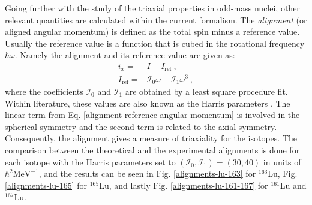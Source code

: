Going further with the study of the triaxial properties in odd-mass nuclei, other relevant quantities are calculated within the current formalism. The \emph{alignment} (or aligned angular momentum) is defined as the total spin minus a reference value. Usually the reference value is a function that is cubed in the rotational frequency $\hbar\omega$. Namely the alignment and its reference value are given as:
\begin{align}
    i_x=&I-I_\text{ref}\ ,\nonumber\\
    I_\text{ref}=&\mathcal{I}_0\omega+\mathcal{I}_1\omega^3\ ,
    \label{alignment-reference-angular-momentum}
\end{align}
where the coefficients $\mathcal{I}_0$ and $\mathcal{I}_1$ are obtained by a least square procedure fit. Within literature, these values are also known as the Harris parameters \cite{harris1965higher}. The linear term from Eq. \ref{alignment-reference-angular-momentum} is involved in the spherical symmetry and the second term is related to the axial symmetry. Consequently, the alignment gives a measure of triaxiality for the isotopes. The comparison between the theoretical and the experimental alignments is done for each isotope with the Harris parameters set to $\left(\mathcal{I}_0,\mathcal{I}_1\right)=\left(30,40\right)$ in units of $\hbar^2\text{MeV}^{-1}$, and the results can be seen in Fig. \ref{alignments-lu-163} for $^{163}$Lu, Fig. \ref{alignments-lu-165} for $^{165}$Lu, and lastly Fig. \ref{alignments-lu-161-167} for $^{161}$Lu and $^{167}$Lu.
